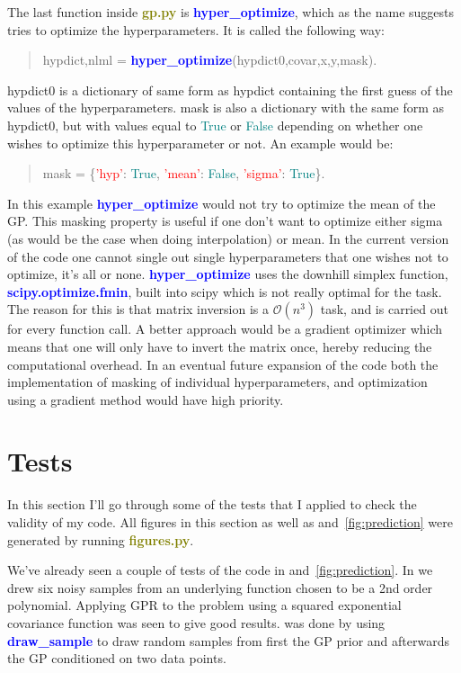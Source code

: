 \documentclass[a4paper,11pt,article,oneside]{memoir}
\newcommand{\pyt}[1]{\textbf{\textcolor{olive}{#1}}}
\newcommand{\dt}[1]{\textcolor{teal}{#1}}
\newcommand{\func}[1]{\textbf{\textcolor{blue}{#1}}}
\newcommand{\va}[1]{\textcolor{nicered}{#1}}
\newcommand{\red}[1]{\textcolor{red}{#1}}
\begin{document}
The last function inside \pyt{gp.py} is \func{hyper\_optimize}, which as the name suggests tries to optimize the hyperparameters. It is called the following way:
%
\begin{quote}
\va{hypdict},\va{nlml} = \func{hyper\_optimize}(\va{hypdict0},\va{covar},\va{x},\va{y},\va{mask}).
\end{quote}
%
\va{hypdict0} is a dictionary of same form as \va{hypdict} containing the first guess of the values of the hyperparameters. \va{mask} is also a dictionary with the same form as \va{hypdict0}, but with values equal to \dt{True} or \dt{False} depending on whether one wishes to optimize this hyperparameter or not. An example would be:
%
\begin{quote}
\va{mask} = \{\red{'hyp'}: \dt{True}, \red{'mean'}: \dt{False}, \red{'sigma'}: \dt{True}\}.
\end{quote}
%
In this example \func{hyper\_optimize} would not try to optimize the mean of the GP. This masking property is useful if one don't want to optimize either \va{sigma} (as would be the case when doing interpolation) or \va{mean}. In the current version of the code one cannot single out single hyperparameters that one wishes not to optimize, it's all or none. \func{hyper\_optimize} uses the downhill simplex function, \func{scipy.optimize.fmin}, built into scipy which is not really optimal for the task. The reason for this is that matrix inversion is a $\mathcal{O}(n^3)$ task, and is carried out for every function call. A better approach would be a gradient optimizer which means that one will only have to invert the matrix once, hereby reducing the computational overhead. In an eventual future expansion of the code both the implementation of masking of individual hyperparameters, and optimization using a gradient method would have high priority.

\chapter{Tests}
\label{sec:tests}

In this section I'll go through some of the tests that I applied to check the validity of my code. All figures in this section as well as  and~\ref{fig:prediction} were generated by running \pyt{figures.py}.

We've already seen a couple of tests of the code in  and~\ref{fig:prediction}. In  we drew six noisy samples from an underlying function chosen to be a 2nd order polynomial. Applying GPR to the problem using a squared exponential covariance function was seen to give good results.  was done by using \func{draw\_sample} to draw random samples from first the GP prior and afterwards the GP conditioned on two data points.
\end{document}
